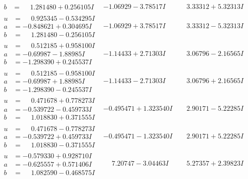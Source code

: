 \documentclass[1p]{elsarticle_modified}
\theoremstyle{definition}
\begin{document}
$$\begin{array}{c|c|c}
\begin{aligned}
b &= \phantom{-}1.281480 + 0.256105 I\end{aligned}
 & -1.06929 - 3.78517 I & \phantom{-}3.33312 + 5.32313 I \\ \hline\begin{aligned}
u &= \phantom{-}0.925345 - 0.534295 I \\
a &= -0.848621 + 0.304695 I \\
b &= \phantom{-}1.281480 - 0.256105 I\end{aligned}
 & -1.06929 + 3.78517 I & \phantom{-}3.33312 - 5.32313 I \\ \hline\begin{aligned}
u &= \phantom{-}0.512185 + 0.958100 I \\
a &= -0.69987 - 1.88985 I \\
b &= -1.298390 + 0.245537 I\end{aligned}
 & -1.14433 + 2.71303 I & \phantom{-}3.06796 - 2.16565 I \\ \hline\begin{aligned}
u &= \phantom{-}0.512185 - 0.958100 I \\
a &= -0.69987 + 1.88985 I \\
b &= -1.298390 - 0.245537 I\end{aligned}
 & -1.14433 - 2.71303 I & \phantom{-}3.06796 + 2.16565 I \\ \hline\begin{aligned}
u &= \phantom{-}0.471678 + 0.778273 I \\
a &= -0.539722 - 0.459733 I \\
b &= \phantom{-}1.018830 + 0.371555 I\end{aligned}
 & -0.495471 + 1.323540 I & \phantom{-}2.90171 - 5.22285 I \\ \hline\begin{aligned}
u &= \phantom{-}0.471678 - 0.778273 I \\
a &= -0.539722 + 0.459733 I \\
b &= \phantom{-}1.018830 - 0.371555 I\end{aligned}
 & -0.495471 - 1.323540 I & \phantom{-}2.90171 + 5.22285 I \\ \hline\begin{aligned}
u &= -0.579330 + 0.928710 I \\
a &= -0.625557 + 0.571406 I \\
b &= \phantom{-}1.082590 - 0.468575 I\end{aligned}
 & \phantom{-}7.20747 - 3.04463 I & \phantom{-}5.27357 + 2.39823 I \\ \hline\begin{aligned}

\end{aligned}
\end{array}$$
\end{document}
